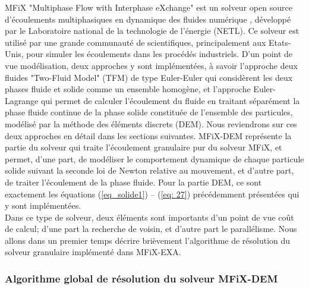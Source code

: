 MFiX "Multiphase Flow with Interphase eXchange" est un solveur open source d’écoulements multiphasiques en dynamique des fluides numérique \cite{garg2012documentation}, développé par le Laboratoire national de la technologie de l’énergie (NETL). Ce solveur est utilisé par une grande communauté de scientifiques, principalement aux Etats-Unis, pour simuler les écoulements dans les procédés industriels. D'un point de vue modélisation, deux approches y sont implémentées, à savoir l'approche deux fluides "Two-Fluid Model" (TFM) de type Euler-Euler qui considèrent les deux phases fluide et solide comme un ensemble homogène, et l'approche Euler-Lagrange qui permet de calculer l'écoulement du fluide en traitant séparément la phase fluide continue de la phase solide constituée de l'ensemble des particules, modélisé par la méthode des éléments discrets (DEM). Nous reviendrons sur ces deux approches en détail dans les sections suivantes. MFiX-DEM représente la partie du solveur qui traite l'écoulement granulaire pur du solveur MFiX, et permet, d’une part, de modéliser le comportement dynamique de chaque particule solide suivant la seconde loi de Newton relative au mouvement, et d’autre part, de traiter l'écoulement de la phase fluide. Pour la partie DEM, ce sont exactement les équations (\ref{eq_solide1}) -- (\ref{eq: 27}) précédemment présentées qui y sont implémentées.\\
Dans ce type de solveur, deux éléments sont importants d'un point de vue coût de calcul; d'une part la recherche de voisin, et d'autre part le parallélisme. Nous allons dans un premier temps décrire brièvement l'algorithme de résolution du solveur granulaire implémenté dans MFiX-EXA.

\subsubsection*{Algorithme global de résolution du solveur MFiX-DEM}

